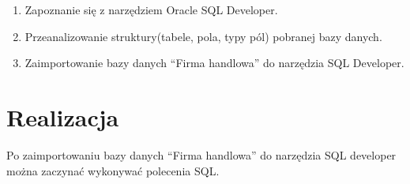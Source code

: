 \documentclass[a4paper, 10pt]{article}
\begin{document}
\begin{enumerate}
\item Zapoznanie się z narzędziem Oracle SQL Developer.
\item Przeanalizowanie struktury(tabele, pola, typy pól) pobranej bazy danych.
\item Zaimportowanie bazy danych ``Firma handlowa'' do narzędzia SQL Developer.
\end{enumerate}

\section{Realizacja}

Po zaimportowaniu bazy danych ``Firma handlowa'' do narzędzia SQL developer można zaczynać wykonywać polecenia SQL.
\end{document}
